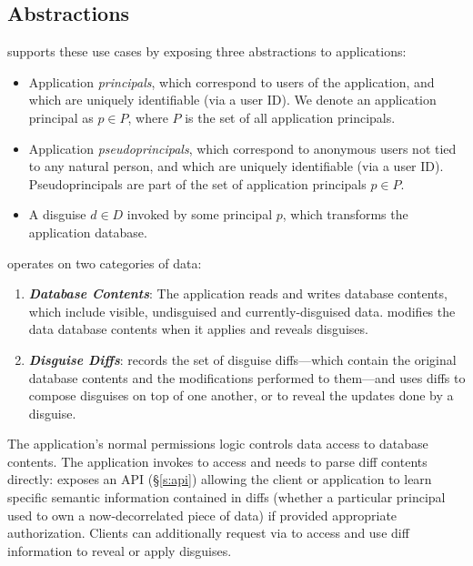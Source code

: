 \subsection{\sys Abstractions}
\sys supports these use cases by exposing three abstractions to applications:
\begin{itemize}
    \item Application \emph{principals}, which correspond to users of the application, 
	and which are uniquely identifiable (\eg via a user ID).
	We denote an application principal as $p \in P$, where $P$ is the set of all application principals.
    \item Application \emph{pseudoprincipals}, which correspond to anonymous users not tied to any natural
    person, and which are uniquely identifiable (\eg via a user ID).
	Pseudoprincipals are part of the set of application principals $p \in P$.
    \item A disguise $d \in D$ invoked by some principal $p$, which 
        transforms the application database.
\end{itemize}
%
%
\sys operates on two categories of data:
\begin{enumerate}
    \item \emph{\textbf{Database Contents}}: The application reads and writes database
        contents, which include visible, undisguised and currently-disguised data.
        \sys modifies the data database contents when it applies and reveals disguises.
    \item \emph{\textbf{Disguise Diffs}}: \sys records the set of disguise diffs---which contain the
        original database contents and the modifications performed to them---and uses diffs to
        compose disguises on top of one another, or to reveal the updates done by a disguise. 
\end{enumerate}

The application's normal permissions logic controls data access to database contents. The
application invokes \sys to access and needs to parse diff contents directly: \sys exposes an API
(\S\ref{s:api}) allowing the client or application to learn specific semantic information contained
in diffs (\eg whether a particular principal used to own a now-decorrelated piece of data) if
provided appropriate authorization. Clients can additionally request via \sys to access and use diff
information to reveal or apply disguises.

